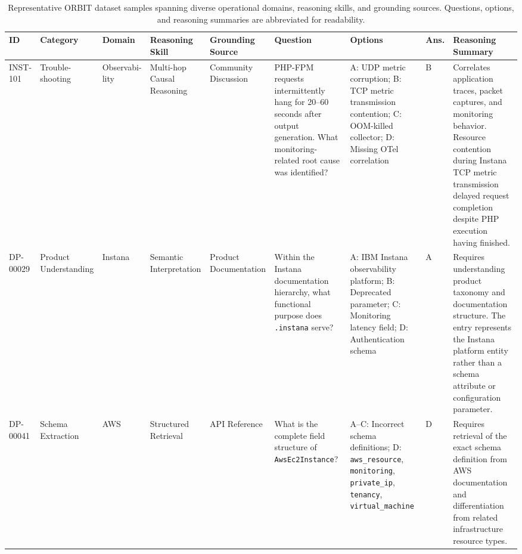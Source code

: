\documentclass[conference]{IEEEtran}
\begin{document}
\begin{table}[t]
\centering
\caption{Representative ORBIT dataset samples spanning diverse operational domains, reasoning skills, and grounding sources. Questions, options, and reasoning summaries are abbreviated for readability.}
\label{tab:orbit_dataset_preview}

\footnotesize
\setlength{\tabcolsep}{3pt}
\renewcommand{\arraystretch}{1.15}

\begin{tabularx}{\textwidth}{
|p{0.8cm}
|p{1.3cm}
|p{1.2cm}
|p{1.8cm}
|p{1.7cm}
|X
|X
|p{0.55cm}
|X|}
\hline

\textbf{ID} &
\textbf{Category} &
\textbf{Domain} &
\textbf{Reasoning Skill} &
\textbf{Grounding Source} &
\textbf{Question} &
\textbf{Options} &
\textbf{Ans.} &
\textbf{Reasoning Summary} \\
\hline

INST-101 &
Trouble-shooting &
Observabi-lity &
Multi-hop Causal Reasoning &
Community Discussion &
PHP-FPM requests intermittently hang for 20--60 seconds after output generation. What monitoring-related root cause was identified? &
A: UDP metric corruption; B: TCP metric transmission contention; C: OOM-killed collector; D: Missing OTel correlation &
B &
Correlates application traces, packet captures, and monitoring behavior. Resource contention during Instana TCP metric transmission delayed request completion despite PHP execution having finished. \\
\hline

DP-00029 &
Product Understanding &
Instana &
Semantic Interpretation &
Product Documentation &
Within the Instana documentation hierarchy, what functional purpose does \texttt{.instana} serve? &
A: IBM Instana observability platform; B: Deprecated parameter; C: Monitoring latency field; D: Authentication schema &
A &
Requires understanding product taxonomy and documentation structure. The entry represents the Instana platform entity rather than a schema attribute or configuration parameter. \\
\hline

DP-00041 &
Schema Extraction &
AWS &
Structured Retrieval &
API Reference &
What is the complete field structure of \texttt{AwsEc2Instance}? &
A--C: Incorrect schema definitions; D: \texttt{aws\_resource}, \texttt{monitoring}, \texttt{private\_ip}, \texttt{tenancy}, \texttt{virtual\_machine} &
D &
Requires retrieval of the exact schema definition from AWS documentation and differentiation from related infrastructure resource types. \\
\hline


\end{tabularx}
\end{table}
\end{document}
